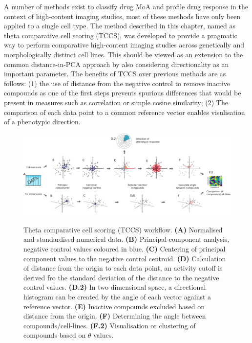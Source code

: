 \documentclass[a4paper,11pt,twoside,openright]{scrbook}
\begin{document}
A number of methods exist to classify drug MoA and profile drug response in the context of high-content imaging studies, most of these methods have only been applied to a single cell type.
The method described in this chapter, named as theta comparative cell scoring (TCCS), was developed to provide a pragmatic way to perform comparative high-content imaging studies across genetically and morphologically distinct cell lines.
This should be viewed as an extension to the common distance-in-PCA approach by also considering directionality as an important parameter.
The benefits of TCCS over previous methods are as follows: (1) the use of distance from the negative control to remove inactive compounds as one of the first steps prevents spurious differences that would be present in measures such as correlation or simple cosine similarity; (2) The comparison of each data point to a common reference vector enables visulisation of a phenotypic direction.


\begin{figure}
    \captionsetup{width=0.8\textwidth}
    \caption[TCCS workflow]{
Theta comparative cell scoring (TCCS) workflow.
\textbf{(A)} Normalised and standardised numerical data.
    \textbf{(B)} Principal component analysis, negative control values coloured in blue.
    \textbf{(C)} Centering of principal component values to the negative control centroid.
    \textbf{(D)} Calculation of distance from the origin to each data point, an activity cutoff is derived fro the standard deviation of the distance to the negative control values.
    \textbf{(D.2)} In two-dimensional space, a directional histogram can be created by the angle of each vector against a reference vector.
    \textbf{(E)} Inactive compounds excluded based on distance from the origin.
    \textbf{(F)} Determining the angle between compounds/cell-lines.
    \textbf{(F.2)} Visualisation or clustering of compounds based on $\theta$ values.
}
    \includegraphics[scale=1.0]{figs/ch3thetaWorkflow}
    \label{figure:theta_workflow}
\end{figure}
\end{document}
